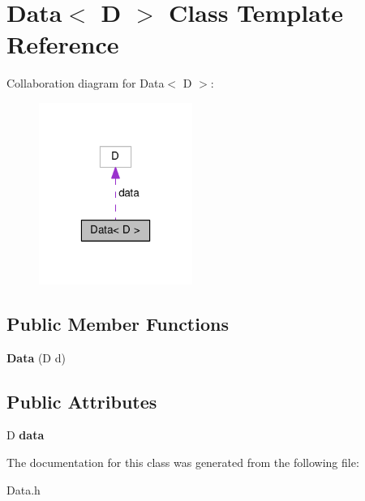 \section{Data$<$ D $>$ Class Template Reference}
\label{class_data}


Collaboration diagram for Data$<$ D $>$\-:
\nopagebreak
\begin{figure}[H]
\begin{center}
\leavevmode
\includegraphics[width=142pt]{class_data__coll__graph}
\end{center}
\end{figure}
\subsection*{Public Member Functions}
\begin{DoxyCompactItemize}
\item 
{\bfseries Data} (D d)\label{class_data_afb1b360c44f982bc3203fc1fe49be529}

\end{DoxyCompactItemize}
\subsection*{Public Attributes}
\begin{DoxyCompactItemize}
\item 
D {\bfseries data}\label{class_data_a781ae42d017fb92a9c386a5d26537f71}

\end{DoxyCompactItemize}


The documentation for this class was generated from the following file\-:\begin{DoxyCompactItemize}
\item 
Data.\-h\end{DoxyCompactItemize}
